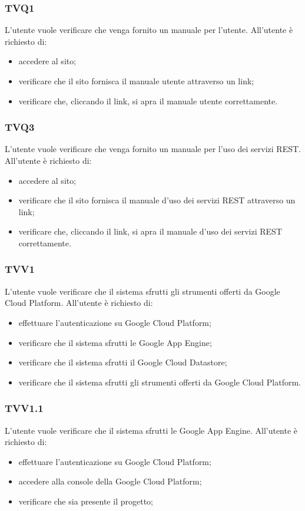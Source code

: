		\subsubsection{TVQ1}
			L'utente vuole verificare che venga fornito un manuale per l'utente. All'utente è richiesto di:
			\begin{itemize}
				\item accedere al sito;
				\item verificare che il sito fornisca il manuale utente attraverso un link;
				\item verificare che, cliccando il link, si apra il manuale utente correttamente.
			\end{itemize}
			
		\subsubsection{TVQ3}
			L'utente vuole verificare che venga fornito un manuale per l'uso dei servizi REST. All'utente è richiesto di:
			\begin{itemize}
				\item accedere al sito;
				\item verificare che il sito fornisca il manuale d'uso dei servizi REST attraverso un link;
				\item verificare che, cliccando il link, si apra il manuale d'uso dei servizi REST correttamente.
			\end{itemize}
			
		\subsubsection{TVV1}
			L'utente vuole verificare che il sistema sfrutti gli strumenti offerti da Google Cloud Platform. All'utente è richiesto di:
			\begin{itemize}
				\item effettuare l'autenticazione su Google Cloud Platform;
				\item verificare che il sistema sfrutti le Google App Engine;
				\item verificare che il sistema sfrutti il Google Cloud Datastore;
				\item verificare che il sistema sfrutti gli strumenti offerti da Google Cloud Platform.
			\end{itemize}
			
		\subsubsection{TVV1.1}
			L'utente vuole verificare che il sistema sfrutti le Google App Engine. All'utente è richiesto di:
			\begin{itemize}
				\item effettuare l'autenticazione su Google Cloud Platform;
				\item accedere alla console della Google Cloud Platform;
				\item verificare che sia presente il progetto;
			\end{itemize}
			
